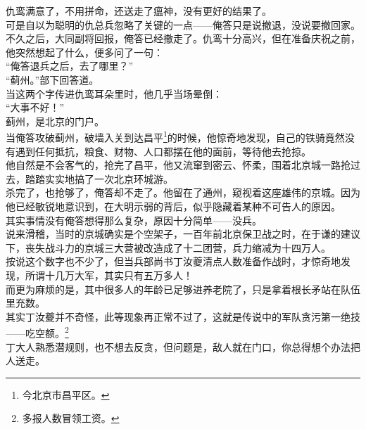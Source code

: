 \begin{multicols}{\theparacolNo}
仇鸾满意了，不用拼命，还送走了瘟神，没有更好的结果了。\\

可是自以为聪明的仇总兵忽略了关键的一点——俺答只是说撤退，没说要撤回家。\\

不久之后，大同副将回报，俺答已经撤走了。仇鸾十分高兴，但在准备庆祝之前，他突然想起了什么，便多问了一句：\\

“俺答退兵之后，去了哪里？”\\

“蓟州。”部下回答道。\\

当这两个字传进仇鸾耳朵里时，他几乎当场晕倒：\\

“大事不好！”\\

蓟州，是北京的门户。\\

当俺答攻破蓟州，破墙入关到达昌平\footnote{今北京市昌平区。}的时候，他惊奇地发现，自己的铁骑竟然没有遇到任何抵抗，粮食、财物、人口都摆在他的面前，等待他去抢掠。\\

他自然是不会客气的，抢完了昌平，他又流窜到密云、怀柔，围着北京城一路抢过去，踏踏实实地搞了一次北京环城游。\\

杀完了，也抢够了，俺答却不走了。他留在了通州，窥视着这座雄伟的京城。因为他已经敏锐地意识到，在大明示弱的背后，似乎隐藏着某种不可告人的原因。\\

其实事情没有俺答想得那么复杂，原因十分简单——没兵。\\

说来滑稽，当时的京城确实是个空架子，一百年前北京保卫战之时，在于谦的建议下，丧失战斗力的京城三大营被改造成了十二团营，兵力缩减为十四万人。\\

按说这个数字也不少了，但当兵部尚书丁汝夔清点人数准备作战时，才惊奇地发现，所谓十几万大军，其实只有五万多人！\\

而更为麻烦的是，其中很多人的年龄已足够进养老院了，只是拿着根长矛站在队伍里充数。\\

其实丁汝夔并不奇怪，此等现象再正常不过了，这就是传说中的军队贪污第一绝技——吃空额。\footnote{多报人数冒领工资。}\\

丁大人熟悉潜规则，也不想去反贪，但问题是，敌人就在门口，你总得想个办法把人送走。\\


\end{multicols}
